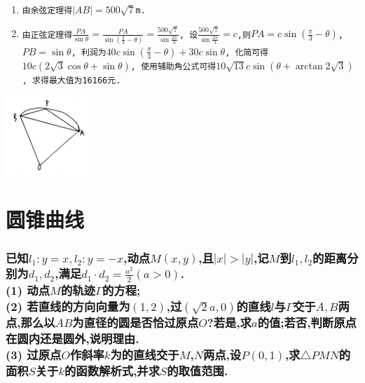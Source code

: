 \documentclass{article}
\newcommand{\1}{\underline{\makebox[1cm]{}}}
\newcommand{\2}{\underline{\makebox[2cm]{}}}
\newcommand{\3}{\underline{\makebox[3cm]{}}}
\newcommand{\4}{\underline{\makebox[4cm]{}}}
\newcommand{\lge}{\large \texttt}
\newlength{\la}
\begin{document}
\begin{minipage}[b]{0.65\linewidth}
    \hfill
    \begin{enumerate}[(1)]
        \item \lge{由余弦定理得$|AB| = 500\sqrt{7}$m.}
        \item \lge{由正弦定理得$\frac{PA}{\sin\theta} = \frac{PA}{\sin(\frac{\pi}{3}-\theta)} = \frac{500\sqrt{7}}{\sin\frac{2\pi}{3}}$, 设$\frac{500\sqrt{7}}{\sin\frac{2\pi}{3}} = c$,则$PA = c \sin(\frac{\pi}{3}-\theta)$, $PB = \sin\theta$, 利润为$40c\sin(\frac{\pi}{3}-\theta) + 30c\sin\theta$, 化简可得$10c(2\sqrt{3}\cos\theta + \sin\theta)$, 使用辅助角公式可得$10\sqrt{13}c\sin(\theta + \arctan 2\sqrt{3})$, 求得最大值为16166元.}
    \end{enumerate}
    \end{minipage}
    \hfill
    \begin{minipage}[b]{0.25\linewidth}
    \includegraphics[height=85pt]{1.png}
\end{minipage}


\part{圆锥曲线}

\section{已知$l_1: y = x, l_2: y = -x$,动点$M(x, y)$,且$|x| > |y|$,记$M$到$l_1, l_2$的距离分别为$d_1, d_2$,满足$d_1 \cdot d_2 = \frac{a^2}{2}(a > 0)$.
\\(1) 动点$M$的轨迹$\Gamma$的方程;
\\(2) 若直线的方向向量为$(1, 2)$,过$(\sqrt{2}a, 0)$的直线$l$与$\Gamma$交于$A, B$两点,那么以$AB$为直径的圆是否恰过原点$O$?若是,求$a$的值;若否,判断原点在圆内还是圆外,说明理由.
\\(3) 过原点$O$作斜率$k$为的直线交于$M$,$N$两点,设$P(0, 1)$,求$\triangle PMN$的面积$S$关于$k$的函数解析式,并求$S$的取值范围.
}
 
\end{document}
